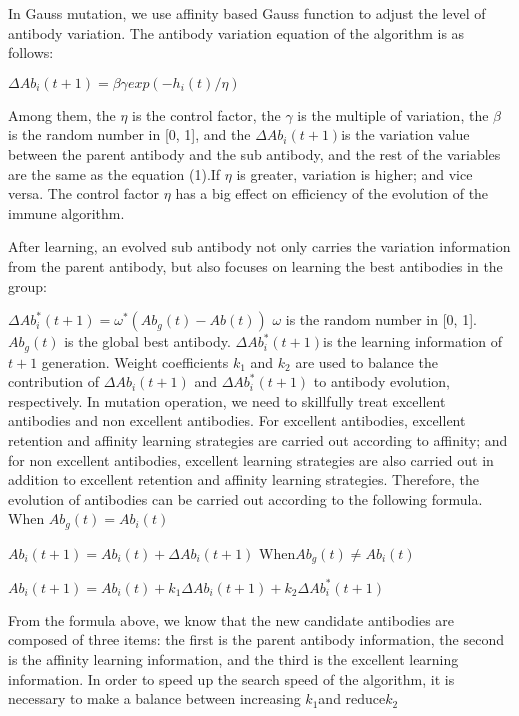 \documentclass{article}
\begin{document}
In Gauss mutation, we use affinity based Gauss function to adjust the level of antibody variation. The antibody variation equation of the algorithm is as follows:
\par\setlength\parindent{7em}
$\Delta Ab_i(t+1)=\beta\gamma
exp(-h_i(t)/\eta)$
\par\setlength\parindent{1em}
Among them, the $\eta$ is the control factor, the $\gamma$ is the multiple of variation, the $\beta$ is the random number in [0, 1], and the
$\Delta Ab_i(t+1)$is the variation value between the parent antibody and the sub antibody, and the rest of the variables are the same as the equation (1).If $\eta$ is  greater, variation is higher; and vice versa. The control factor $\eta$ has a big effect on efficiency of the evolution of the immune algorithm.
\par\setlength\parindent{1em}
After learning, an evolved sub antibody not only carries the variation information from the parent antibody, but also focuses on learning the best antibodies in the group:
\par\setlength\parindent{7em}
$\Delta Ab_i^*(t+1)= \omega^*(Ab_g(t)-Ab(t))$
\newline
$\omega $ is the random number in [0, 1]. $ Ab_g(t)$ is the global best antibody. $\Delta Ab_i^*(t+1)$is the learning information of$t + 1$ generation. Weight coefficients $k_1$ and $k_2$ are used to balance the contribution of $\Delta Ab_i(t+1)$ and $\Delta Ab_i^*(t+1)$ to antibody evolution, respectively. In mutation operation, we need to skillfully treat excellent antibodies and non excellent antibodies. For excellent antibodies, excellent retention and affinity learning strategies are carried out according to affinity; and for non excellent antibodies, excellent learning strategies are also carried out in addition to excellent retention and affinity learning strategies. Therefore, the evolution of antibodies can be carried out according to the following formula.
\newline 
When $Ab_g(t)=Ab_i(t)$
\par\setlength\parindent{7em}
$Ab_i(t+1)=Ab_i(t)+ \Delta Ab_i(t+1)$
\newline 
When$Ab_g(t)\neq Ab_i(t)$
\par\setlength\parindent{7em}
$Ab_i(t+1)=Ab_i(t)+k_1\Delta Ab_i(t+1)+k_2\Delta Ab_i^*(t+1)$
\par\setlength\parindent{1em}
From the formula above, we know that the new candidate antibodies are composed of three items: the first is the parent antibody information, the second is the affinity learning information, and the third is the excellent learning information. In order to speed up the search speed of the algorithm, it is necessary to make a balance between increasing $k_1$and reduce$k_2$
\end{document}

